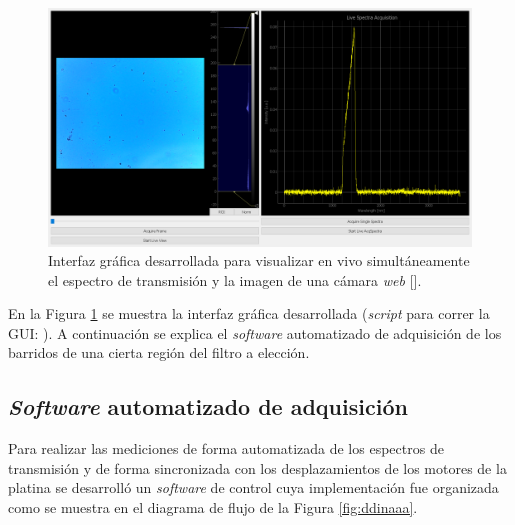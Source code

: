 \begin{figure}[H]
	\centering
	\includegraphics[width=1.0\textwidth]{Figs/microespectrometro/medicionbandacelesteGUI.png}
	\caption{Interfaz gráfica desarrollada para visualizar en vivo simultáneamente el espectro de transmisión y la imagen de una cámara \textit{web} [\href{https://github.com/jrr1984/defectsGUI/blob/master/start.py}{\faGithub}].}
	\label{fig:inaaa}
\end{figure}

En la Figura \ref{fig:inaaa} se muestra la interfaz gráfica desarrollada (\textit{script} para correr la GUI: \href{https://github.com/jrr1984/defectsGUI/blob/master/start.py}{\faGithub}). A continuación se explica el \textit{software} automatizado de adquisición de los barridos de una cierta región del filtro a elección.


\singlespacing
\subsection{\textit{Software} automatizado de adquisición \href{https://github.com/jrr1984/open\_frame\_XYStage}{\faGithub}}
\label{sec:softadq}

 \hspace{0.5cm}Para realizar las mediciones de forma automatizada de los espectros de transmisión y de forma sincronizada con los desplazamientos de los motores de la platina se desarrolló un \textit{software} de control cuya implementación fue organizada como se muestra en el diagrama de flujo de la Figura \ref{fig:ddinaaa}.
 
